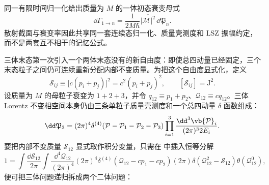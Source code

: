 同一有限时间归一化给出质量为 \(M\) 的一体初态衰变母式
\begin{equation}
 {
 \dd\Gamma_{1\to n}
 =\frac{1}{2M\hbar}
 \overline{|\mathcal M|^2}\,\dd\mathfrak P_n.}
 \label{eq:master-decay-rate-si-r9}
\end{equation}
散射截面与衰变率因此共享同一套连续态归一化、质量壳测度和 LSZ 振幅约定，而不是两套互不相干的记忆公式。


三体末态第一次引入一个两体末态没有的新自由度：即使总四动量已经固定，三个末态粒子之间仍可连续重新分配内部不变质量。为把这个自由度显式化，定义
\begin{equation}
 \mathcal S_{ij}
 \equiv \bigl[c(p_i+p_j)\bigr]^2
 =c^2(p_i+p_j)^2,
 \qquad [\mathcal S_{ij}]=\mathrm{J^2}.
 \label{eq:threebody-invariant-mass-energy2-dp52}
\end{equation}
设质量为 $M$ 的母粒子衰变为 $1+2+3$，并令
$q_{12}\equiv p_1+p_2$、$\mathcal Q_{12}\equiv c q_{12}$。三体 Lorentz 不变相空间本身仍由三条单粒子质量壳测度和一个总四动量 $\delta$ 函数组成：
\begin{equation}
 {
 \dd\mathfrak P_3
 =(2\pi)^4\delta^{(4)}
 (\mathcal P-\mathcal P_1-\mathcal P_2-\mathcal P_3)
 \prod_{i=1}^{3}
 \frac{\dd^3 \vb{\mathcal P}_i}{(2\pi)^3 2E_i}.}
 \label{eq:phase3-definition-dp68}
\end{equation}
要把内部不变质量 $\mathcal S_{12}$ 显式取作积分变量，只需在 中插入恒等分解
\begin{equation*}
 1=\int\frac{\dd\mathcal S_{12}}{2\pi}
 \int\frac{\dd^4 \mathcal Q_{12}}{(2\pi)^4}
 (2\pi)^4\delta^{(4)}(\mathcal Q_{12}-c p_1-c p_2)
 (2\pi)\delta(\mathcal Q_{12}^2-\mathcal S_{12})\theta(\mathcal Q_{12}^0),
\end{equation*}
便可把三体问题递归拆成两个二体问题：


